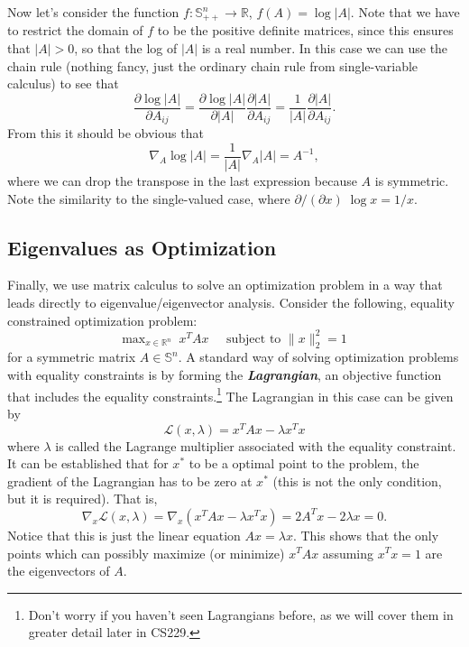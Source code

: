 \documentclass[12pt]{article}
\begin{document}
Now let's consider the function $f:\mathbb{S}^n_{++} \rightarrow
\mathbb{R}$, $f(A) = \log |A|$.  Note that we have to restrict the
domain of $f$ to be the positive definite matrices, since this ensures
that $|A| > 0$, so that the log of $|A|$ is a real number.  In this
case we can use the chain rule (nothing fancy, just the ordinary chain
rule from single-variable calculus) to see that
\[\frac{\partial \log |A|}{\partial A_{ij}} = \frac{\partial \log
  |A|}{\partial |A|} \frac{\partial |A|}{\partial A_{ij}} =
   \frac{1}{|A|}\frac{\partial |A|}{\partial A_{ij}}.\]
From this it should be obvious that 
\[\nabla_A \log |A| = \frac{1}{|A|}\nabla_A |A| = A^{-1},\] 
where we can drop the transpose in the last expression because $A$ is
symmetric.  Note the similarity to the single-valued case, where
$\partial/(\partial x)\; \log x = 1/x$.

\subsection{Eigenvalues as Optimization}

Finally, we use matrix calculus to solve an optimization problem in a
way that leads directly to eigenvalue/eigenvector analysis.  Consider
the following, equality constrained optimization problem:
\[\mathrm{max}_{x \in \mathbb{R}^n} \;\; x^T A x \;\;\;\;\;
\mbox{subject to } \|x\|_2^2 = 1\]
for a symmetric matrix $A \in \mathbb{S}^{n}$.
A standard way of solving optimization problems with equality
constraints is by forming the \textbf{\textit{Lagrangian}}, an
objective function that includes the equality
constraints.\footnote{Don't worry if you haven't seen Lagrangians
  before, as we will cover them in greater detail later in CS229.}
The Lagrangian in this case can be given by
\[\mathcal{L}(x, \lambda) = x^T A x - \lambda x^T x\]
where $\lambda$ is called the Lagrange multiplier associated with the
equality constraint.  It can be established that for $x^*$ to be a
optimal point to the problem, the gradient of the Lagrangian has to be
zero at $x^*$ (this is not the only condition, but it is required).
That is, 
\[\nabla_x \mathcal{L}(x,\lambda) = \nabla_x(x^T A x - \lambda x^T x)
= 2 A^T x - 2 \lambda x = 0.\]
Notice that this is just the linear equation $Ax = \lambda x$.  This
shows that the only points which can possibly maximize (or minimize)
$x^T A x$ assuming $x^T x = 1$ are the eigenvectors of $A$.
\end{document}
